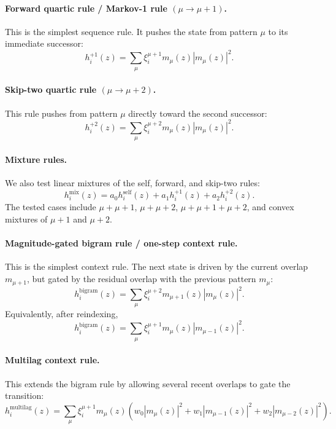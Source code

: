 \documentclass[11pt]{article}
\begin{document}
\paragraph{Forward quartic rule / Markov-1 rule $(\mu\rightarrow\mu+1)$.}
This is the simplest sequence rule.  It pushes the state from pattern $\mu$ to
its immediate successor:
\begin{equation}
h_i^{+1}(z)
=
\sum_\mu
\xi_i^{\mu+1}
m_{\mu}(z)
\left|m_{\mu}(z)\right|^2 .
\end{equation}

\paragraph{Skip-two quartic rule $(\mu\rightarrow\mu+2)$.}
This rule pushes from pattern $\mu$ directly toward the second successor:
\begin{equation}
h_i^{+2}(z)
=
\sum_\mu
\xi_i^{\mu+2}
m_{\mu}(z)
\left|m_{\mu}(z)\right|^2 .
\end{equation}

\paragraph{Mixture rules.}
We also test linear mixtures of the self, forward, and skip-two rules:
\begin{equation}
h_i^{\mathrm{mix}}(z)
=
a_0 h_i^{\mathrm{self}}(z)
+
a_1 h_i^{+1}(z)
+
a_2 h_i^{+2}(z).
\end{equation}
The tested cases include $\mu+\mu+1$, $\mu+\mu+2$,
$\mu+\mu+1+\mu+2$, and convex mixtures of $\mu+1$ and $\mu+2$.

\paragraph{Magnitude-gated bigram rule / one-step context rule.}
This is the simplest context rule.  The next state is driven by the current
overlap $m_{\mu+1}$, but gated by the residual overlap with the previous pattern
$m_\mu$:
\begin{equation}
h_i^{\mathrm{bigram}}(z)
=
\sum_\mu
\xi_i^{\mu+2}
m_{\mu+1}(z)
\left|m_{\mu}(z)\right|^2 .
\end{equation}
Equivalently, after reindexing,
\begin{equation}
h_i^{\mathrm{bigram}}(z)
=
\sum_\mu
\xi_i^{\mu+1}
m_{\mu}(z)
\left|m_{\mu-1}(z)\right|^2 .
\end{equation}

\paragraph{Multilag context rule.}
This extends the bigram rule by allowing several recent overlaps to gate the
transition:
\begin{equation}
h_i^{\mathrm{multilag}}(z)
=
\sum_\mu
\xi_i^{\mu+1}
m_\mu(z)
\left(
w_0 |m_\mu(z)|^2
+
w_1 |m_{\mu-1}(z)|^2
+
w_2 |m_{\mu-2}(z)|^2
\right).
\end{equation}
\end{document}
